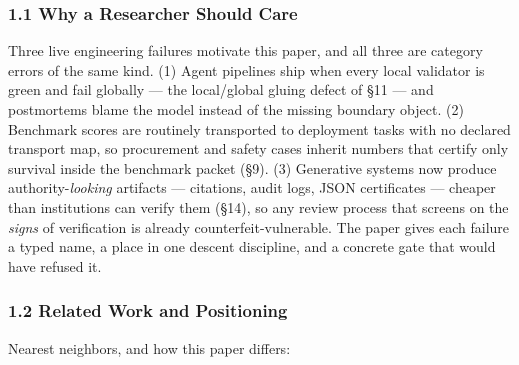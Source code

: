 \documentclass[
  10pt,
]{article}
\begin{document}
\subsubsection{1.1 Why a Researcher Should Care}\label{why-a-researcher-should-care}

Three live engineering failures motivate this paper, and all three are category errors of the same kind. (1) Agent pipelines ship when every local validator is green and fail globally --- the local/global gluing defect of §11 --- and postmortems blame the model instead of the missing boundary object. (2) Benchmark scores are routinely transported to deployment tasks with no declared transport map, so procurement and safety cases inherit numbers that certify only survival inside the benchmark packet (§9). (3) Generative systems now produce authority-\emph{looking} artifacts --- citations, audit logs, JSON certificates --- cheaper than institutions can verify them (§14), so any review process that screens on the \emph{signs} of verification is already counterfeit-vulnerable. The paper gives each failure a typed name, a place in one descent discipline, and a concrete gate that would have refused it.

\subsubsection{1.2 Related Work and Positioning}\label{related-work-and-positioning}

Nearest neighbors, and how this paper differs:
\end{document}
